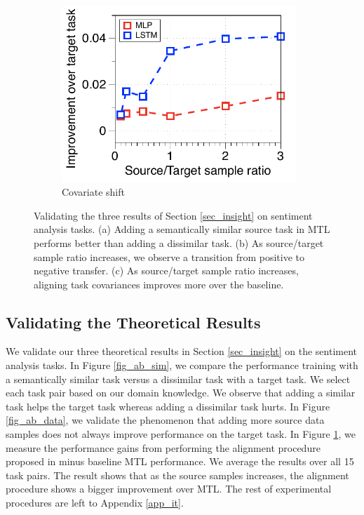 \begin{figure}[!t]
\begin{subfigure}[b]{0.33\textwidth}
		\includegraphics[width=0.975\textwidth]{figures/ratio_alignment_norm_diff_all.pdf}
		\caption{Covariate shift}
		\label{fig_ab_cov}
	\end{subfigure}
	\caption{Validating the three results of Section \ref{sec_insight} on sentiment analysis tasks. (a) Adding a semantically similar source task in MTL performs better than adding a dissimilar task.
	(b) As source/target sample ratio increases, we observe a transition from positive to negative transfer.
	(c) As source/target sample ratio increases, aligning task covariances \cite{WZR20} improves more over the baseline.}
	\label{fig_ablation}
	\vspace{-0.15in}
\end{figure}

\vspace{-0.07in}
\subsection{Validating the Theoretical Results}

We validate our three theoretical results in Section \ref{sec_insight} on the sentiment analysis tasks.
In Figure \ref{fig_ab_sim}, we compare the performance training with a semantically similar task versus a dissimilar task with a target task.
We select each task pair based on our domain knowledge.
We observe that adding a similar task helps the target task whereas adding a dissimilar task hurts.
In Figure \ref{fig_ab_data}, we validate the phenomenon that adding more source data samples does not always improve performance on the target task.
In Figure \ref{fig_ab_cov}, we measure the performance gains from performing the alignment procedure proposed in \cite{WZR20} minus baseline MTL performance.
We average the results over all 15 task pairs.
The result shows that as the source samples increases, the alignment procedure shows a bigger improvement over MTL.
The rest of experimental procedures are left to Appendix \ref{app_it}.


